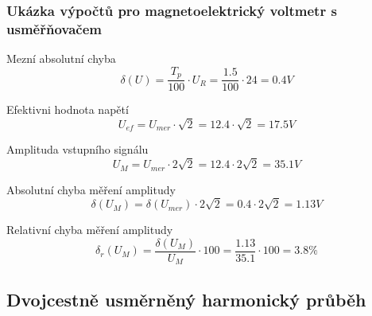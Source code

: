\documentclass{praktikum}
\begin{document}
\subsubsection{Ukázka výpočtů pro magnetoelektrický voltmetr s usměřňovačem}
Mezní absolutní chyba
\begin{equation}
\label{eqn:vypocet_jedno_meznichyba}
\delta (U) = \frac{T_p}{100}\cdot U_R = \frac{1.5}{100}\cdot 24=0.4V
\end{equation}

Efektivni hodnota napětí
\begin{equation}
\label{eqn:vypocet_jedno_eff}
U_{ef} = U_{mer} \cdot\sqrt{2} = 12.4 \cdot\sqrt{2} = 17.5V
\end{equation}

Amplituda vstupního signálu
\begin{equation}
\label{eqn:vypocet_jedno_amplituda}
U_M = U_{mer} \cdot 2\sqrt{2} = 12.4 \cdot 2\sqrt{2} = 35.1V
\end{equation}

Absolutní chyba měření amplitudy
\begin{equation}
\label{eqn:vypocet_jedno_abschyba_amp}
\delta (U_M) = \delta (U_{mer}) \cdot 2\sqrt{2} = 0.4 \cdot 2\sqrt{2} = 1.13V
\end{equation}

Relativní chyba měření amplitudy
\begin{equation}
\label{eqn:vypocet_jedno_relchyba_amp}
\delta _r (U_M) = \frac{\delta (U_M)}{U_M}\cdot 100 = \frac{1.13}{35.1}\cdot 100 = 3.8 \%
\end{equation}

\subsection{Dvojcestně usměrněný harmonický průběh}
\end{document}
